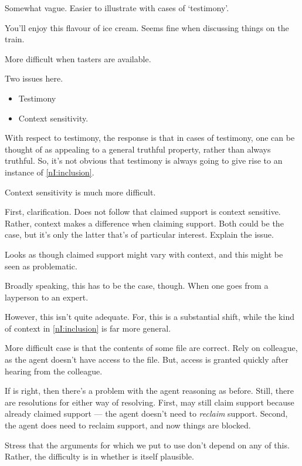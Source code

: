 \begin{note}
  Somewhat vague.
  Easier to illustrate with cases of `testimony'.

  You'll enjoy this flavour of ice cream.
  Seems fine when discussing things on the train.

  More difficult when tasters are available.

  Two issues here.
  \begin{itemize}
  \item Testimony
  \item Context sensitivity.
  \end{itemize}

  With respect to testimony, the response is that in cases of testimony, one can be thought of as appealing to a general truthful property, rather than always truthful.
  So, it's not obvious that testimony is always going to give rise to an instance of \ref{nI:inclusion}.

  Context sensitivity is much more difficult.

  First, clarification.
  Does not follow that claimed support is context sensitive.
  Rather, context makes a difference when claiming support.
  Both could be the case, but it's only the latter that's of particular interest.
  Explain the issue.

  Looks as though claimed support might vary with context, and this might be seen as problematic.

  Broadly speaking, this has to be the case, though.
  When one goes from a layperson to an expert.

  However, this isn't quite adequate.
  For, this is a substantial shift, while the kind of context in \ref{nI:inclusion} is far more general.

  More difficult case is that the contents of some file are correct.
  Rely on colleague, as the agent doesn't have access to the file.
  But, access is granted quickly after hearing from the colleague.

  If \nI{} is right, then there's a problem with the agent reasoning as before.
  Still, there are resolutions for either way of resolving.
  First, may still claim support because already claimed support --- the agent doesn't need to \emph{reclaim} support.
  Second, the agent does need to reclaim support, and now things are blocked.

  Stress that the arguments for which we put \nI{} to use don't depend on any of this.
  Rather, the difficulty is in whether \nI{} is itself plausible.


\end{note}
